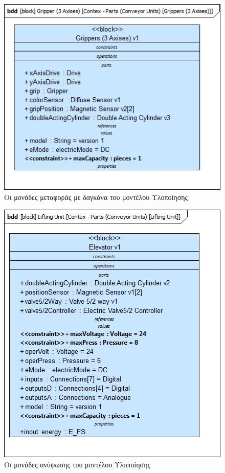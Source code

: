 \documentclass[a4paper,12pt,twoside]{report}
\begin{document}
\begin{appendices}
				\begin{figure}[hp]
					\centering
					\includegraphics[scale=0.50]{DesignModel_Contex-Parts(ConveyorUnits)[Grippers(3Axises)].png}
					\caption{Οι μονάδες μεταφοράς με δαγκάνα του μοντέλου Υλοποίησης}
					\label{φωτ:Οι μονάδες μεταφοράς με δαγκάνα του μοντέλου Υλοποίησης}
				\end{figure}
				
				\begin{figure}[hp]
					\centering
					\includegraphics[scale=0.50]{DesignModel_Contex-Parts(ConveyorUnits)[LiftingUnit].png}
					\caption{Οι μονάδες ανύψωσης του μοντέλου Υλοποίησης}
					\label{φωτ:Οι μονάδες ανύψωσης του μοντέλου Υλοποίησης}
				\end{figure}
				

\end{appendices}
\end{document}
